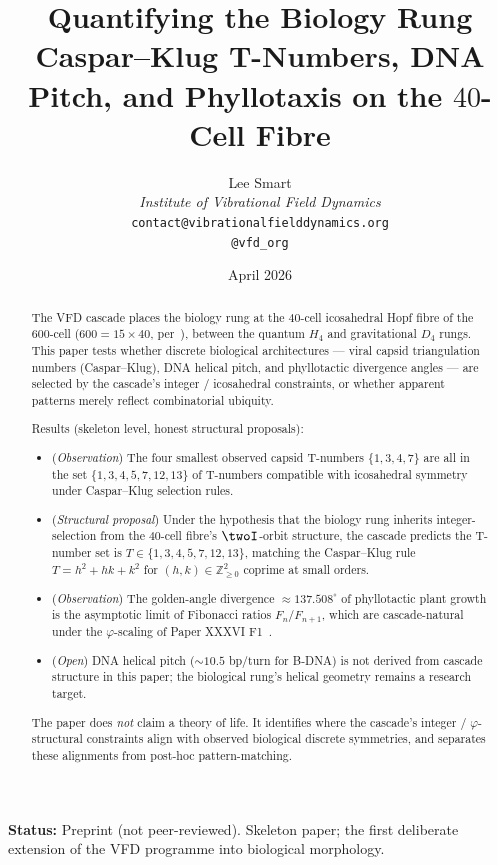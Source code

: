\documentclass[12pt]{article}
\title{Quantifying the Biology Rung\\[6pt]
\large Caspar--Klug T-Numbers, DNA Pitch, and Phyllotaxis on the $40$-Cell Fibre}
\author{%
  Lee Smart\\[4pt]
  \textit{Institute of Vibrational Field Dynamics}\\[2pt]
  \texttt{contact@vibrationalfielddynamics.org}\\[2pt]
  \texttt{@vfd\_org}%
}
\date{April 2026}
\theoremstyle{definition}
\theoremstyle{remark}
\begin{document}
\maketitle

\noindent\textbf{Status:} Preprint (not peer-reviewed). Skeleton paper; the first deliberate extension of the VFD programme into biological morphology.

\begin{abstract}
The VFD cascade places the biology rung at the $40$-cell icosahedral Hopf fibre of the 600-cell ($600 = 15 \times 40$, per~\citep{SmartXXXV}), between the quantum $H_4$ and gravitational $D_4$ rungs. This paper tests whether discrete biological architectures --- viral capsid triangulation numbers (Caspar--Klug), DNA helical pitch, and phyllotactic divergence angles --- are selected by the cascade's integer / icosahedral constraints, or whether apparent patterns merely reflect combinatorial ubiquity.

Results (skeleton level, honest structural proposals):
\begin{itemize}
\item (\emph{Observation}) The four smallest observed capsid T-numbers $\{1, 3, 4, 7\}$ are all in the set $\{1, 3, 4, 5, 7, 12, 13\}$ of T-numbers compatible with icosahedral symmetry under Caspar--Klug selection rules.
\item (\emph{Structural proposal}) Under the hypothesis that the biology rung inherits integer-selection from the $40$-cell fibre's $\twoI$-orbit structure, the cascade predicts the T-number set is $T \in \{1, 3, 4, 5, 7, 12, 13\}$, matching the Caspar--Klug rule $T = h^2 + hk + k^2$ for $(h, k) \in \mathbb{Z}_{\ge 0}^2$ coprime at small orders.
\item (\emph{Observation}) The golden-angle divergence $\approx 137.508^\circ$ of phyllotactic plant growth is the asymptotic limit of Fibonacci ratios $F_n / F_{n+1}$, which are cascade-natural under the $\varphi$-scaling of Paper XXXVI F1~\citep{SmartXXXVI}.
\item (\emph{Open}) DNA helical pitch ($\sim 10.5$ bp/turn for B-DNA) is not derived from cascade structure in this paper; the biological rung's helical geometry remains a research target.
\end{itemize}
The paper does \emph{not} claim a theory of life. It identifies where the cascade's integer / $\varphi$-structural constraints align with observed biological discrete symmetries, and separates these alignments from post-hoc pattern-matching.
\end{abstract}
\end{document}
